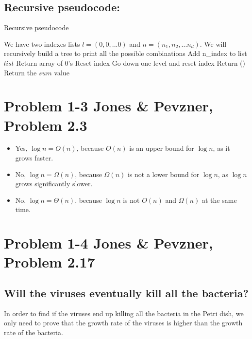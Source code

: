 \documentclass{article}
\begin{document}
\subsection*{Recursive pseudocode:}

\begin{algorithm}[H]
\caption{Recursive pseudocode}
\begin{algorithmic}[1]
\State We have two indexes lists $l = (0,0,...0)$ and $n = (n_1,n_2,...n_d)$.
\State We will recursively build a tree to print all the possible combinations
 \State Add n_index to list $list$
  \State Return array of 0's
 \EndIf
  \State Reset index
 \EndIf
  \State Go down one level and reset index
 \EndIf
{}
\State Return ()
\EndFunction
\State Return the $sum$ value
\end{algorithmic}
\end{algorithm}

\section*{Problem 1-3 Jones \& Pevzner, Problem 2.3}

\begin{itemize}

\item Yes, $\log n = O(n)$, because $O(n)$ is an upper bound for $\log n$, as it grows faster.

\item No, $\log n = \Omega(n)$, because $\Omega(n)$ is not a lower bound for $\log n$, as $\log n$ grows significantly slower.

\item No, $\log n = \Theta(n)$, because $\log n$ is not $O(n)$ and $\Omega(n)$ at the same time.

\end{itemize}

\section*{Problem 1-4 Jones \& Pevzner, Problem 2.17}

\subsection*{Will the viruses eventually kill all the bacteria?}
In order to find if the viruses end up killing all the bacteria in the Petri dish, we only need to prove that the growth rate of the viruses is higher than the growth rate of the bacteria.
\end{document}
